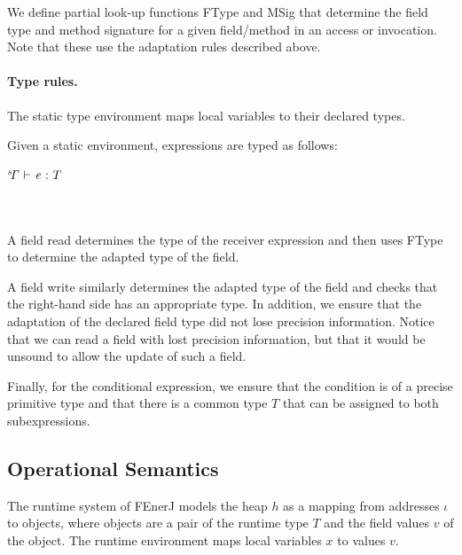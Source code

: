 We define partial look-up functions FType and MSig that determine the field
type and method signature for a given field/method in an access or
invocation.
Note that these use the adaptation rules described above.


\paragraph{Type rules.}

The static type environment \sG{} maps local variables to their
declared types.

Given a static environment, expressions are typed as follows:

\vspace{0.5ex}
\noindent
\begin{ottdefnblock}[#1]{$ \mathit{ {^s}\!\Gamma} \  \textsf{$\vdash$} \  \mathit{e} \  \textsf{:} \  T $}{}
\ottusedrule{\ottdruletrXXread{}}\\[2mm]
\ottusedrule{\ottdruletrXXwrite{}}\\[2mm]
\ottusedrule{\ottdruletrXXcond{}}\\
\end{ottdefnblock}

A field read determines the type of the receiver expression and then
uses FType to determine the adapted type of the field.

A field write similarly determines the adapted type of the field and
checks that the right-hand side has an appropriate type.
In addition, we ensure that the adaptation of the declared field type
did not lose precision information.
Notice that we can read a field with lost precision information, but
that it would be unsound to allow the update of such a field.

Finally, for the conditional expression, we ensure that the condition
is of a precise primitive type and that there is a common type $T$
that can be assigned to both subexpressions.



\subsection{Operational Semantics}

The runtime system of FEnerJ models the heap $h$ as a mapping from
addresses $\iota$ to objects, where objects are a pair of the runtime
type $T$ and the field values $v$ of the object.
The runtime environment \rG{} maps local variables $x$ to values
$v$.

